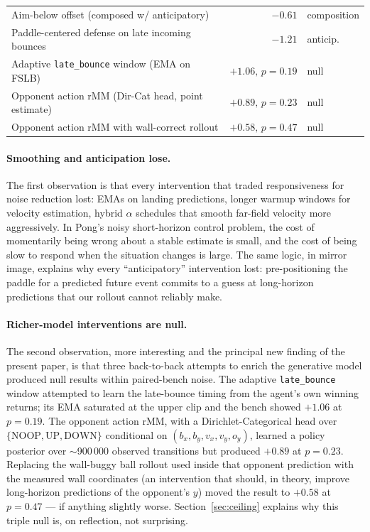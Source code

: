 \documentclass[runningheads]{llncs}
\begin{document}
\begin{table}[t]
\begin{tabular}{lrl}
Aim-below offset (composed w/ anticipatory)                     & $-0.61$           & composition \\
Paddle-centered defense on late incoming bounces                & $-1.21$           & anticip.    \\
Adaptive \texttt{late\_bounce} window (EMA on FSLB)             & $+1.06,\,p{=}0.19$& null        \\
Opponent action rMM (Dir-Cat head, point estimate)              & $+0.89,\,p{=}0.23$& null        \\
Opponent action rMM with wall-correct rollout                   & $+0.58,\,p{=}0.47$& null        \\
\bottomrule
\end{tabular}
\end{table}

\paragraph{Smoothing and anticipation lose.}
The first observation is that every intervention that traded
responsiveness for noise reduction lost: EMAs on landing
predictions, longer warmup windows for velocity estimation, hybrid
$\alpha$ schedules that smooth far-field velocity more
aggressively. In Pong's noisy short-horizon control problem, the
cost of momentarily being wrong about a stable estimate is small,
and the cost of being slow to respond when the situation changes
is large. The same logic, in mirror image, explains why every
``anticipatory'' intervention lost: pre-positioning the paddle for
a predicted future event commits to a guess at long-horizon
predictions that our rollout cannot reliably make.

\paragraph{Richer-model interventions are null.}
The second observation, more interesting and the principal new
finding of the present paper, is that three back-to-back attempts
to enrich the generative model produced null results within
paired-bench noise. The adaptive \texttt{late\_bounce} window
attempted to learn the late-bounce timing from the agent's own
winning returns; its EMA saturated at the upper clip and the bench
showed $+1.06$ at $p=0.19$. The opponent action rMM, with a
Dirichlet-Categorical head over $\{\text{NOOP},\text{UP},\text{DOWN}\}$
conditional on $(b_x, b_y, v_x, v_y, o_y)$, learned a policy
posterior over $\sim$900\,000 observed transitions but produced
$+0.89$ at $p=0.23$. Replacing the wall-buggy ball rollout used
inside that opponent prediction with the measured wall coordinates
(an intervention that should, in theory, improve long-horizon
predictions of the opponent's $y$) moved the result to $+0.58$ at
$p=0.47$ --- if anything slightly worse. Section~\ref{sec:ceiling}
explains why this triple null is, on reflection, not surprising.
\end{document}

